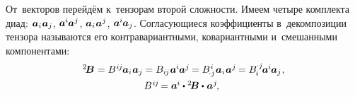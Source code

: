 \begin{otherlanguage}{russian}
От~векторов перейдём к~тензорам второй сложности.
Имеем четыре комплекта диад:
${\bm{a}_i \hspace{.1ex} \bm{a}_j}$,
\hbox{$\bm{a}^{\hspace{-0.05ex}i} \hspace{-0.1ex} \bm{a}^{\hspace{0.05ex}j}$\hspace{-0.25ex},}
\hbox{$\bm{a}_i \hspace{.1ex} \bm{a}^{\hspace{0.05ex}j}$\hspace{-0.25ex},}
${\bm{a}^{\hspace{-0.05ex}i} \hspace{-0.1ex} \bm{a}_j}$.
Согласующиеся коэффициенты в~декомпозиции тензора называются его контра\-вариант\-ными, ко\-вариант\-ными и~смешан\-ными компонентами:
\vspace{.1em}\begin{equation}\begin{array}{c}
{^2\!\bm{B}} \hspace{.1ex} =
B^{\hspace{.1ex}i\hspace{-0.1ex}j} \hspace{-0.1ex} \bm{a}_i \hspace{.1ex} \bm{a}_j \hspace{-0.05ex} =
B_{i\hspace{-0.1ex}j} \hspace{.1ex} \bm{a}^{\hspace{-0.05ex}i} \hspace{-0.1ex} \bm{a}^{\hspace{0.05ex}j} \hspace{-0.15ex} =
B_{\hspace{-0.2ex} \cdot j}^{\hspace{.1ex}i} \hspace{.1ex} \bm{a}_i \hspace{.1ex} \bm{a}^{\hspace{0.05ex}j} \hspace{-0.15ex} =
B_{\hspace{-0.1ex}i}^{\hspace{-0.05ex} \cdot j} \hspace{-0.2ex} \bm{a}^{\hspace{-0.05ex}i} \hspace{-0.1ex} \bm{a}_j \hspace{.1ex}, \\[0.4em]
%
B^{\hspace{.1ex}i\hspace{-0.1ex}j} \hspace{-0.25ex} = \bm{a}^{\hspace{-0.05ex}i} \dotp {^2\!\bm{B}} \dotp \hspace{.1ex} \bm{a}^{\hspace{.05ex}j} \hspace{-0.2ex}, \:\,

\end{array}
\end{equation}
\end{otherlanguage}

